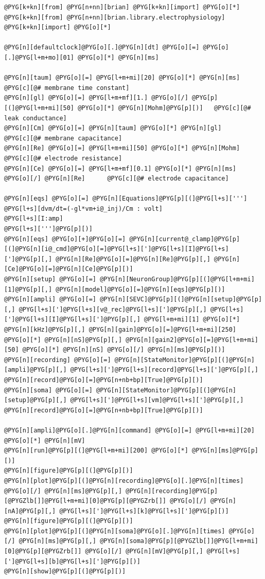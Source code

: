 \documentclass[letterpaper,10pt,english]{manual}
\begin{document}
\begin{Verbatim}[commandchars=@\[\]]
@PYG[k+kn][from] @PYG[n+nn][brian] @PYG[k+kn][import] @PYG[o][*]
@PYG[k+kn][from] @PYG[n+nn][brian.library.electrophysiology] @PYG[k+kn][import] @PYG[o][*]

@PYG[n][defaultclock]@PYG[o][.]@PYG[n][dt] @PYG[o][=] @PYG[o][.]@PYG[l+m+mo][01] @PYG[o][*] @PYG[n][ms]

@PYG[n][taum] @PYG[o][=] @PYG[l+m+mi][20] @PYG[o][*] @PYG[n][ms]        @PYG[c][@# membrane time constant]
@PYG[n][gl] @PYG[o][=] @PYG[l+m+mf][1.] @PYG[o][/] @PYG[p][(]@PYG[l+m+mi][50] @PYG[o][*] @PYG[n][Mohm]@PYG[p][)]   @PYG[c][@# leak conductance]
@PYG[n][Cm] @PYG[o][=] @PYG[n][taum] @PYG[o][*] @PYG[n][gl]        @PYG[c][@# membrane capacitance]
@PYG[n][Re] @PYG[o][=] @PYG[l+m+mi][50] @PYG[o][*] @PYG[n][Mohm]        @PYG[c][@# electrode resistance]
@PYG[n][Ce] @PYG[o][=] @PYG[l+m+mf][0.1] @PYG[o][*] @PYG[n][ms] @PYG[o][/] @PYG[n][Re]      @PYG[c][@# electrode capacitance]

@PYG[n][eqs] @PYG[o][=] @PYG[n][Equations]@PYG[p][(]@PYG[l+s][''']
@PYG[l+s][dvm/dt=(-gl*vm+i@_inj)/Cm : volt]
@PYG[l+s][I:amp]
@PYG[l+s][''']@PYG[p][)]
@PYG[n][eqs] @PYG[o][+]@PYG[o][=] @PYG[n][current@_clamp]@PYG[p][(]@PYG[n][i@_cmd]@PYG[o][=]@PYG[l+s][']@PYG[l+s][I]@PYG[l+s][']@PYG[p][,] @PYG[n][Re]@PYG[o][=]@PYG[n][Re]@PYG[p][,] @PYG[n][Ce]@PYG[o][=]@PYG[n][Ce]@PYG[p][)]
@PYG[n][setup] @PYG[o][=] @PYG[n][NeuronGroup]@PYG[p][(]@PYG[l+m+mi][1]@PYG[p][,] @PYG[n][model]@PYG[o][=]@PYG[n][eqs]@PYG[p][)]
@PYG[n][ampli] @PYG[o][=] @PYG[n][SEVC]@PYG[p][(]@PYG[n][setup]@PYG[p][,] @PYG[l+s][']@PYG[l+s][v@_rec]@PYG[l+s][']@PYG[p][,] @PYG[l+s][']@PYG[l+s][I]@PYG[l+s][']@PYG[p][,] @PYG[l+m+mi][1] @PYG[o][*] @PYG[n][kHz]@PYG[p][,] @PYG[n][gain]@PYG[o][=]@PYG[l+m+mi][250] @PYG[o][*] @PYG[n][nS]@PYG[p][,] @PYG[n][gain2]@PYG[o][=]@PYG[l+m+mi][50] @PYG[o][*] @PYG[n][nS] @PYG[o][/] @PYG[n][ms]@PYG[p][)]
@PYG[n][recording] @PYG[o][=] @PYG[n][StateMonitor]@PYG[p][(]@PYG[n][ampli]@PYG[p][,] @PYG[l+s][']@PYG[l+s][record]@PYG[l+s][']@PYG[p][,] @PYG[n][record]@PYG[o][=]@PYG[n+nb+bp][True]@PYG[p][)]
@PYG[n][soma] @PYG[o][=] @PYG[n][StateMonitor]@PYG[p][(]@PYG[n][setup]@PYG[p][,] @PYG[l+s][']@PYG[l+s][vm]@PYG[l+s][']@PYG[p][,] @PYG[n][record]@PYG[o][=]@PYG[n+nb+bp][True]@PYG[p][)]

@PYG[n][ampli]@PYG[o][.]@PYG[n][command] @PYG[o][=] @PYG[l+m+mi][20] @PYG[o][*] @PYG[n][mV]
@PYG[n][run]@PYG[p][(]@PYG[l+m+mi][200] @PYG[o][*] @PYG[n][ms]@PYG[p][)]
@PYG[n][figure]@PYG[p][(]@PYG[p][)]
@PYG[n][plot]@PYG[p][(]@PYG[n][recording]@PYG[o][.]@PYG[n][times] @PYG[o][/] @PYG[n][ms]@PYG[p][,] @PYG[n][recording]@PYG[p][@PYGZlb[]]@PYG[l+m+mi][0]@PYG[p][@PYGZrb[]] @PYG[o][/] @PYG[n][nA]@PYG[p][,] @PYG[l+s][']@PYG[l+s][k]@PYG[l+s][']@PYG[p][)]
@PYG[n][figure]@PYG[p][(]@PYG[p][)]
@PYG[n][plot]@PYG[p][(]@PYG[n][soma]@PYG[o][.]@PYG[n][times] @PYG[o][/] @PYG[n][ms]@PYG[p][,] @PYG[n][soma]@PYG[p][@PYGZlb[]]@PYG[l+m+mi][0]@PYG[p][@PYGZrb[]] @PYG[o][/] @PYG[n][mV]@PYG[p][,] @PYG[l+s][']@PYG[l+s][b]@PYG[l+s][']@PYG[p][)]
@PYG[n][show]@PYG[p][(]@PYG[p][)]
\end{Verbatim}
\end{document}
